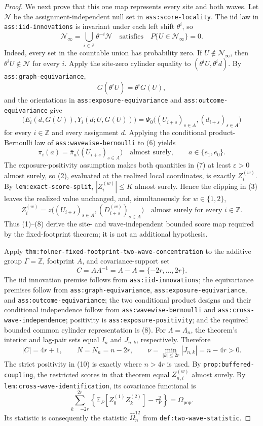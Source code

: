 \documentclass{article}
\begin{document}
\begin{proof}
We next prove that this one map represents every site and both waves.  Let \(\mathcal N\) be the assignment-independent null set in \texttt{ass:score-locality}.  The iid law in \texttt{ass:iid-innovations} is invariant under each left shift \(\theta^i\), so
\[
 \mathcal N_\infty=\bigcup_{i\in\mathbb Z}\theta^{-i}\mathcal N
 \quad\text{satisfies}\quad
 P\{U\in\mathcal N_\infty\}=0. \tag{4}
\]
Indeed, every set in the countable union has probability zero.  If \(U\notin\mathcal N_\infty\), then \(\theta^iU\notin\mathcal N\) for every \(i\).  Apply the site-zero cylinder equality to \((\theta^iU,\theta^id)\).  By \texttt{ass:graph-equivariance},
\[
 G(\theta^iU)=\theta^iG(U), \tag{5}
\]
and the orientations in \texttt{ass:exposure-equivariance} and \texttt{ass:outcome-equivariance} give
\[
 \bigl(E_i(d,G(U)),Y_i(d;U,G(U))\bigr)
 =\Psi_0\bigl((U_{i+s})_{s\in A},(d_{i+s})_{s\in A}\bigr) \tag{6}
\]
for every \(i\in\mathbb Z\) and every assignment \(d\).  Applying the conditional product-Bernoulli law of \texttt{ass:wavewise-bernoulli} to (6) yields
\[
 \pi_i(a)=\bar\pi_a\bigl((U_{i+s})_{s\in A}\bigr)
 \quad\text{almost surely},
 \qquad a\in\{e_1,e_0\}. \tag{7}
\]
The exposure-positivity assumption makes both quantities in (7) at least \(\varepsilon>0\) almost surely, so (2), evaluated at the realized local coordinates, is exactly \(Z_i^{(w)}\).  By \texttt{lem:exact-score-split}, \(|Z_i^{(w)}|\le K\) almost surely.  Hence the clipping in (3) leaves the realized value unchanged, and, simultaneously for \(w\in\{1,2\}\),
\[
 Z_i^{(w)}
 =z\bigl((U_{i+s})_{s\in A},(D_{i+s}^{(w)})_{s\in A}\bigr)
 \quad\text{almost surely for every }i\in\mathbb Z. \tag{8}
\]
Thus (1)--(8) derive the site- and wave-independent bounded score map required by the fixed-footprint theorem; it is not an additional hypothesis.

Apply \texttt{thm:folner-fixed-footprint-two-wave-concentration} to the additive group \(\Gamma=\mathbb Z\), footprint \(A\), and covariance-support set
\[
 C=AA^{-1}=A-A=\{-2r,\ldots,2r\}. \tag{9}
\]
The iid innovation premise follows from \texttt{ass:iid-innovations}; the equivariance premises follow from \texttt{ass:graph-equivariance}, \texttt{ass:exposure-equivariance}, and \texttt{ass:outcome-equivariance}; the two conditional product designs and their conditional independence follow from \texttt{ass:wavewise-bernoulli} and \texttt{ass:cross-wave-independence}; positivity is \texttt{ass:exposure-positivity}; and the required bounded common cylinder representation is (8).  For \(\Lambda=\Lambda_n\), the theorem's interior and lag-pair sets equal \(I_n\) and \(J_{n,k}\), respectively.  Therefore
\[
 |C|=4r+1,
 \qquad N=N_n=n-2r,
 \qquad
 \nu=\min_{|k|\le 2r}|J_{n,k}|=n-4r>0. \tag{10}
\]
The strict positivity in (10) is exactly where \(n>4r\) is used.  By \texttt{prop:buffered-coupling}, the restricted scores in that theorem equal \(Z_{n,i}^{(w)}\) almost surely.  By \texttt{lem:cross-wave-identification}, its covariance functional is
\[
 \sum_{k=-2r}^{2r}
 \left\{\mathbb E_P[Z_0^{(1)}Z_k^{(2)}]-\tau_{\mathrm P}^2\right\}
 =\Omega_{\mathrm{pop}}. \tag{11}
\]
Its statistic is consequently the statistic \(\widehat\Omega_n^{12}\) from \texttt{def:two-wave-statistic}.


\end{proof}
\end{document}

